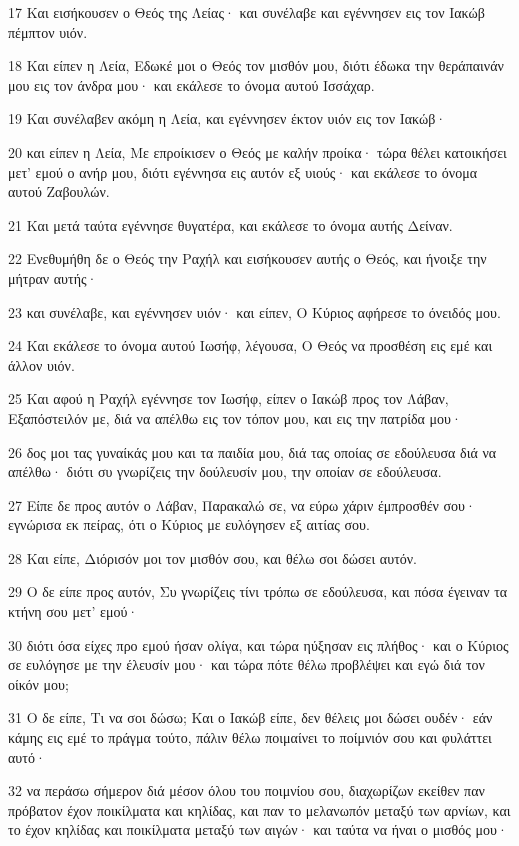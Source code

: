 \par 17 Και εισήκουσεν ο Θεός της Λείας· και συνέλαβε και εγέννησεν εις τον Ιακώβ πέμπτον υιόν.
\par 18 Και είπεν η Λεία, Εδωκέ μοι ο Θεός τον μισθόν μου, διότι έδωκα την θεράπαινάν μου εις τον άνδρα μου· και εκάλεσε το όνομα αυτού Ισσάχαρ.
\par 19 Και συνέλαβεν ακόμη η Λεία, και εγέννησεν έκτον υιόν εις τον Ιακώβ·
\par 20 και είπεν η Λεία, Με επροίκισεν ο Θεός με καλήν προίκα· τώρα θέλει κατοικήσει μετ' εμού ο ανήρ μου, διότι εγέννησα εις αυτόν εξ υιούς· και εκάλεσε το όνομα αυτού Ζαβουλών.
\par 21 Και μετά ταύτα εγέννησε θυγατέρα, και εκάλεσε το όνομα αυτής Δείναν.
\par 22 Ενεθυμήθη δε ο Θεός την Ραχήλ και εισήκουσεν αυτής ο Θεός, και ήνοιξε την μήτραν αυτής·
\par 23 και συνέλαβε, και εγέννησεν υιόν· και είπεν, Ο Κύριος αφήρεσε το όνειδός μου.
\par 24 Και εκάλεσε το όνομα αυτού Ιωσήφ, λέγουσα, Ο Θεός να προσθέση εις εμέ και άλλον υιόν.
\par 25 Και αφού η Ραχήλ εγέννησε τον Ιωσήφ, είπεν ο Ιακώβ προς τον Λάβαν, Εξαπόστειλόν με, διά να απέλθω εις τον τόπον μου, και εις την πατρίδα μου·
\par 26 δος μοι τας γυναίκάς μου και τα παιδία μου, διά τας οποίας σε εδούλευσα διά να απέλθω· διότι συ γνωρίζεις την δούλευσίν μου, την οποίαν σε εδούλευσα.
\par 27 Είπε δε προς αυτόν ο Λάβαν, Παρακαλώ σε, να εύρω χάριν έμπροσθέν σου· εγνώρισα εκ πείρας, ότι ο Κύριος με ευλόγησεν εξ αιτίας σου.
\par 28 Και είπε, Διόρισόν μοι τον μισθόν σου, και θέλω σοι δώσει αυτόν.
\par 29 Ο δε είπε προς αυτόν, Συ γνωρίζεις τίνι τρόπω σε εδούλευσα, και πόσα έγειναν τα κτήνη σου μετ' εμού·
\par 30 διότι όσα είχες προ εμού ήσαν ολίγα, και τώρα ηύξησαν εις πλήθος· και ο Κύριος σε ευλόγησε με την έλευσίν μου· και τώρα πότε θέλω προβλέψει και εγώ διά τον οίκόν μου;
\par 31 Ο δε είπε, Τι να σοι δώσω; Και ο Ιακώβ είπε, δεν θέλεις μοι δώσει ουδέν· εάν κάμης εις εμέ το πράγμα τούτο, πάλιν θέλω ποιμαίνει το ποίμνιόν σου και φυλάττει αυτό·
\par 32 να περάσω σήμερον διά μέσον όλου του ποιμνίου σου, διαχωρίζων εκείθεν παν πρόβατον έχον ποικίλματα και κηλίδας, και παν το μελανωπόν μεταξύ των αρνίων, και το έχον κηλίδας και ποικίλματα μεταξύ των αιγών· και ταύτα να ήναι ο μισθός μου·
